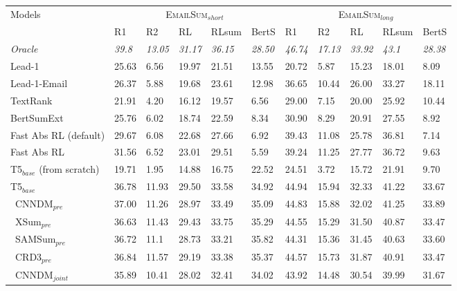 \begin{savenotes}
\begin{table*}
\begin{center}
\small
\begin{tabular}{lllllllllll}
\toprule 
Models & \multicolumn{5}{c}{\textsc{EmailSum}$_{short}$} & \multicolumn{5}{c}{\textsc{EmailSum}$_{long}$} \\
 \cmidrule(lr){2-6} \cmidrule(lr){7-11}
& R1 & R2 & RL & RLsum & BertS & R1 & R2 & RL & RLsum & BertS \\
 \midrule
 \emph{Oracle} &  \emph{39.8} &  \emph{13.05} &  \emph{31.17} &  \emph{36.15} & \emph{28.50} &  \emph{46.74} &  \emph{17.13} &  \emph{33.92} &  \emph{43.1} & \emph{28.38}  \\
Lead-1 & 25.63  & 6.56 & 19.97 & 21.51 & 13.55 & 20.72 & 5.87 & 15.23 & 18.01 & 8.09 \\
Lead-1-Email & 26.37 & 5.88 & 19.68 & 23.61 & 12.98 & 36.65 & 10.44 & 26.00 & 33.27 & 18.11 \\
TextRank & 21.91 & 4.20 & 16.12 & 19.57 & 6.56 & 29.00 & 7.15 & 20.00 & 25.92 & 10.44 \\
BertSumExt & 25.76 & 6.02 & 18.74 & 22.59 & 8.34 & 30.90 & 8.29 & 20.91 & 27.55 & 8.92 \\
 \midrule
Fast Abs RL (default)  & 29.67 & 6.08 & 22.68 & 27.66 & 6.92 & 39.43 & 11.08 & 25.78 & 36.81 & 7.14 \\
Fast Abs RL  & 31.56 & 6.52 & 23.01 & 29.51 & 5.59 & 39.24 & 11.25 & 27.77 & 36.72 & 9.63 \\
T5$_{base}$ (from scratch) & 19.71 & 1.95 & 14.88 & 16.75 & 22.52 & 24.51 & 3.72 & 15.72 & 21.91 & 9.70 \\
T5$_{base}$ & 36.78 & 11.93 & 29.50 & 33.58 & 34.92 & 44.94 & 15.94 & 32.33 & 41.22 & 33.67 \\
\cmidrule(lr){1-1}
\ CNNDM$_{pre}$ & 37.00 & 11.26 & 28.97 & 33.49 & 35.09 & 44.83 & 15.88 & 32.02 & 41.25 & 33.89 \\
\ XSum$_{pre}$ & 36.63 & 11.43 & 29.43 & 33.75 & 35.29 & 44.55 & 15.29 & 31.50 & 40.87 & 33.47 \\
\ SAMSum$_{pre}$ & 36.72 & 11.1 & 28.73 & 33.21 & 35.82 & 44.31 & 15.36 & 31.45 & 40.63 & 33.60  \\
\ CRD3$_{pre}$ &  36.84 & 11.57 & 29.19 & 33.38 & 35.37 & 44.57 & 15.73 & 31.87 & 40.91 & 33.47   \\
\cmidrule(lr){1-1}
\ CNNDM$_{joint}$ & 35.89 & 10.41 & 28.02 & 32.41 & 34.02 & 43.92 & 14.48 & 30.54 & 39.99 & 31.67 \\

\end{tabular}
\end{center}
\end{table*}
\end{savenotes}
